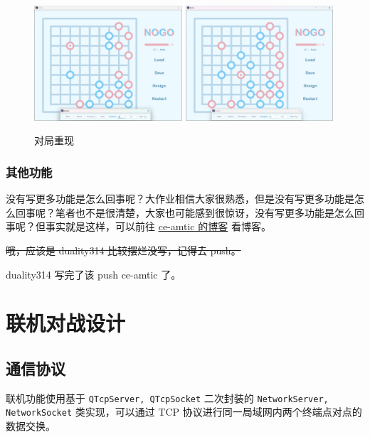 \documentclass{noithesis}
\begin{document}
	\begin{figure}[htbp]
		\centering
		
		\includegraphics[width=5.5cm]{img/review1.png}	
		\includegraphics[width=5.5cm]{img/review2.png}
		
		\caption{对局重现}
	\end{figure}

	\subsubsection{其他功能}
	
	没有写更多功能是怎么回事呢？大作业相信大家很熟悉，但是没有写更多功能是怎么回事呢？笔者也不是很清楚，大家也可能感到很惊讶，没有写更多功能是怎么回事呢？但事实就是这样，可以前往 \href{https://ce-amtic.github.io/}{ce-amtic 的博客} 看博客。
	
	\sout{哦，应该是 duality314 比较摆烂没写，记得去 push。}
	
	duality314 写完了该 push ce-amtic 了。
	
	\section{联机对战设计}
	
	\subsection{通信协议}
	
	联机功能使用基于 \verb|QTcpServer, QTcpSocket| 二次封装的 \verb|NetworkServer, NetworkSocket| 类实现，可以通过 TCP 协议进行同一局域网内两个终端点对点的数据交换。
	
\end{document}

